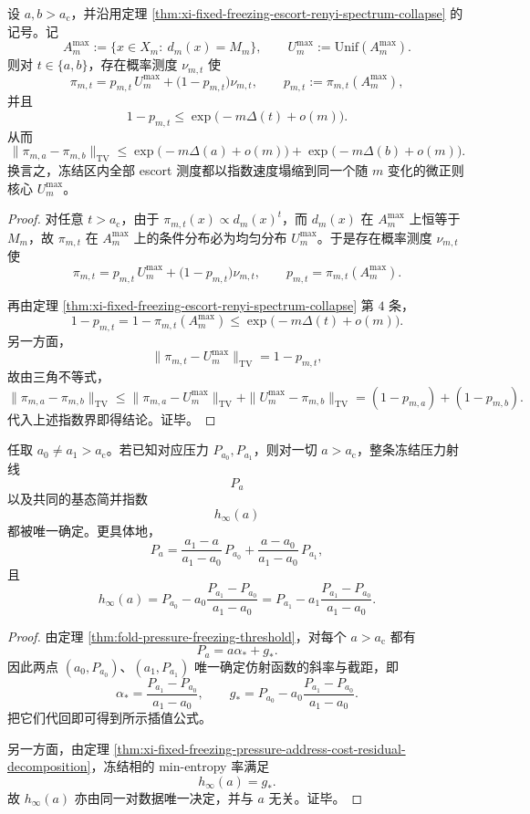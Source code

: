 \begin{theorem}\label{thm:xi-time-part75a-frozen-escort-microcanonical-collapse}
设 \(a,b>a_{\mathrm c}\)，并沿用定理 \ref{thm:xi-fixed-freezing-escort-renyi-spectrum-collapse} 的记号。记
\[
A_m^{\max}:=\{x\in X_m:\ d_m(x)=M_m\},
\qquad
U_m^{\max}:=\mathrm{Unif}(A_m^{\max}).
\]
则对 \(t\in\{a,b\}\)，存在概率测度 \(\nu_{m,t}\) 使
\[
\pi_{m,t}
=
p_{m,t}\,U_m^{\max}
+
\bigl(1-p_{m,t}\bigr)\nu_{m,t},
\qquad
p_{m,t}:=\pi_{m,t}(A_m^{\max}),
\]
并且
\[
1-p_{m,t}
\le
\exp\!\bigl(-m\Delta(t)+o(m)\bigr).
\]
从而
\[
\|\pi_{m,a}-\pi_{m,b}\|_{\mathrm{TV}}
\le
\exp\!\bigl(-m\Delta(a)+o(m)\bigr)
+
\exp\!\bigl(-m\Delta(b)+o(m)\bigr).
\]
换言之，冻结区内全部 escort 测度都以指数速度塌缩到同一个随 \(m\) 变化的微正则核心 \(U_m^{\max}\)。
\end{theorem}
\begin{proof}
对任意 \(t>a_{\mathrm c}\)，由于 \(\pi_{m,t}(x)\propto d_m(x)^t\)，而 \(d_m(x)\) 在 \(A_m^{\max}\) 上恒等于 \(M_m\)，故 \(\pi_{m,t}\) 在 \(A_m^{\max}\) 上的条件分布必为均匀分布 \(U_m^{\max}\)。于是存在概率测度 \(\nu_{m,t}\) 使
\[
\pi_{m,t}
=
p_{m,t}\,U_m^{\max}
+
\bigl(1-p_{m,t}\bigr)\nu_{m,t},
\qquad
p_{m,t}=\pi_{m,t}(A_m^{\max}).
\]

再由定理 \ref{thm:xi-fixed-freezing-escort-renyi-spectrum-collapse} 第 \(4\) 条，
\[
1-p_{m,t}
=
1-\pi_{m,t}(A_m^{\max})
\le
\exp\!\bigl(-m\Delta(t)+o(m)\bigr).
\]
另一方面，
\[
\|\pi_{m,t}-U_m^{\max}\|_{\mathrm{TV}}
=
1-p_{m,t},
\]
故由三角不等式，
\[
\|\pi_{m,a}-\pi_{m,b}\|_{\mathrm{TV}}
\le
\|\pi_{m,a}-U_m^{\max}\|_{\mathrm{TV}}
+
\|U_m^{\max}-\pi_{m,b}\|_{\mathrm{TV}}
=
(1-p_{m,a})+(1-p_{m,b}).
\]
代入上述指数界即得结论。证毕。
\end{proof}

\begin{corollary}[冻结压力射线的两点确定律]\label{cor:xi-time-part75a-freezing-pressure-ray-two-point-determination}
任取 \(a_0\neq a_1>a_{\mathrm c}\)。若已知对应压力 \(P_{a_0},P_{a_1}\)，则对一切 \(a>a_{\mathrm c}\)，整条冻结压力射线
\[
P_a
\]
以及共同的基态简并指数
\[
h_\infty(a)
\]
都被唯一确定。更具体地，
\[
P_a
=
\frac{a_1-a}{a_1-a_0}\,P_{a_0}
+
\frac{a-a_0}{a_1-a_0}\,P_{a_1},
\]
且
\[
h_\infty(a)
=
P_{a_0}-a_0\frac{P_{a_1}-P_{a_0}}{a_1-a_0}
=
P_{a_1}-a_1\frac{P_{a_1}-P_{a_0}}{a_1-a_0}.
\]
\end{corollary}
\begin{proof}
由定理 \ref{thm:fold-pressure-freezing-threshold}，对每个 \(a>a_{\mathrm c}\) 都有
\[
P_a=a\alpha_*+g_*.
\]
因此两点 \((a_0,P_{a_0})\)、\((a_1,P_{a_1})\) 唯一确定仿射函数的斜率与截距，即
\[
\alpha_*=\frac{P_{a_1}-P_{a_0}}{a_1-a_0},
\qquad
g_*=P_{a_0}-a_0\frac{P_{a_1}-P_{a_0}}{a_1-a_0}.
\]
把它们代回即可得到所示插值公式。

另一方面，由定理 \ref{thm:xi-fixed-freezing-pressure-address-cost-residual-decomposition}，冻结相的 min-entropy 率满足
\[
h_\infty(a)=g_*.
\]
故 \(h_\infty(a)\) 亦由同一对数据唯一决定，并与 \(a\) 无关。证毕。
\end{proof}

\endinput
